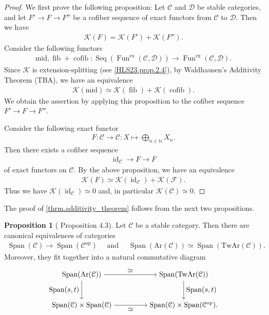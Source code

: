 \documentclass[a4paper,dvipdfmx,11pt,reqno]{amsart}
\DeclareMathOperator{\myop}{op}
\DeclareMathOperator{\id}{id}
\DeclareMathOperator{\fib}{fib}
\DeclareMathOperator{\cofib}{cofib}
\renewcommand{\mid}{\mathrm{mid}}
\DeclareMathOperator{\Fun}{Fun}
\newcommand{\C}{\mathcal{C}}
\newcommand{\D}{\mathcal{D}}
\newcommand{\F}{\mathcal{F}}
\newcommand{\K}{\mathcal{K}}
\DeclareMathOperator{\Seq}{Seq}
\DeclareMathOperator{\Span}{Span}
\newcommand{\Ar}{\mathrm{Ar}}
\newcommand{\TwAr}{\mathrm{TwAr}}
\theoremstyle{definition}
\newtheorem{proposition}[theorem]{Proposition}
\begin{document}
\begin{proof}
  We first prove the following proposition:
  Let $\C$ and $\D$ be stable categories, and let $F' \to F \to F''$ be a cofiber sequence of exact functors from $\C$ to $\D$.
  Then we have 
  \begin{align*}
    \K(F) = \K(F') + \K(F'').
  \end{align*}
  Consider the following functors 
  \begin{align*}
    \mid, \fib+\cofib : \Seq(\Fun^{\mathrm{ex}}(\C,\D)) \to \Fun^{\mathrm{ex}}(\C,\D).
  \end{align*}
  Since $\K$ is extension-splitting (see \cref{HLS23.prop.2.4}), by Waldhausen's Additivity Theorem (TBA), we have an equivalence %
  \begin{align*}
    \K(\mid) \simeq \K(\fib) + \K(\cofib).
  \end{align*}
  We obtain the assertion by applying this proposition to the cofiber sequence $F' \to F \to F''$.

  Consider the following exact functor
  \begin{align*}
    F : \C \to \C : X \mapsto \bigoplus_{n \in \mathbb{N}} X_n .
  \end{align*}
  Then there exists a cofiber sequence 
  \begin{align*}
    \id_{\C} \to F \to F
  \end{align*}
  of exact functors on $\C$.
  By the above proposition, we have an equivalence 
  \begin{align*}
    \K(F) \simeq \K(\id_{\C}) + \K(\F). 
  \end{align*}
  Thus we have $\K(\id_{\C}) \simeq 0$ and, in particular $\K(\C) \simeq 0$.
\end{proof}

The proof of \cref{thrm.additivity_theorem} follows from the next two propositions.

\begin{proposition}[\cite{HLS23} Proposition 4.3] \label{HLS23.prop.4.3}
  Let $\C$ be a stable category.
  Then there are canonical equivalences of categories
  \begin{align*}
    \Span(\C) \to \Span(\C^{\myop}) 
    \quad \text{ and } \quad 
    \Span(\Ar(\C)) \simeq \Span(\TwAr(\C)).
  \end{align*}
  Moreover, they fit together into a natural commutative diagram 
  \[\begin{tikzpicture}[auto,->] 
    \node (tl) at (0,1.5) {$\Span(\Ar(\C))$}; 
    \node (tr) at (5,1.5) {$\Span(\TwAr(\C))$};
    \node (bl) at (0,0) {$\Span(\C) \times \Span(\C)$}; 
    \node (br) at (5,0) {$\Span(\C) \times \Span(\C^{\myop}).$}; 
    \draw (tl) -- node {$\simeq$} (tr); 
    \draw (bl) -- node[swap] {$\simeq$} (br); 
    \draw (tl) -- node[swap] {$\Span(s,t)$} (bl);
    \draw (tr) -- node {$\Span(s,t)$} (br); 
  \end{tikzpicture}\]
\end{proposition}
\end{document}
